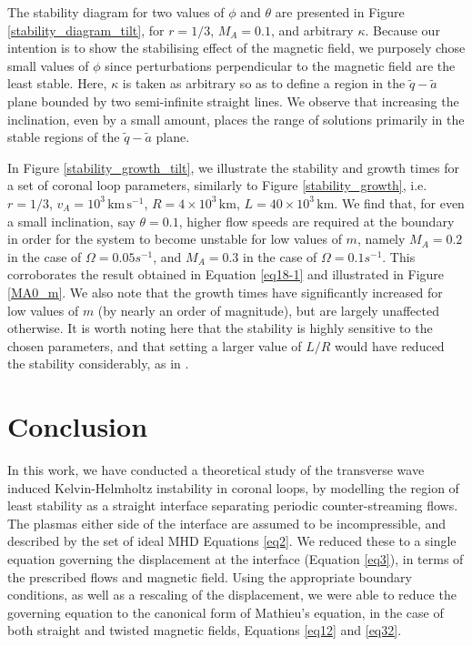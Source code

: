 \documentclass[12pt]{ociamthesis}
\begin{document}
The stability diagram for two values of $\phi$ and $\theta$ are presented in Figure \ref{stability_diagram_tilt}, for $r=1/3$, $M_A=0.1$, and arbitrary $\kappa$.
Because our intention is to show the stabilising effect of the magnetic field, we purposely chose small values of $\phi$ since perturbations perpendicular to the magnetic field are the least stable.
Here, $\kappa$ is taken as arbitrary so as to define a region in the $\tilde q - \tilde a$ plane bounded by two semi-infinite straight lines.
We observe that increasing the inclination, even by a small amount, places the range of solutions primarily in the stable regions of the $\tilde q - \tilde a$ plane.

In Figure \ref{stability_growth_tilt}, we illustrate the stability and growth times for a set of coronal loop parameters, similarly to Figure \ref{stability_growth}, i.e. $r = 1/3$, $v_A = 10^3 \, \mathrm{km}\, \mathrm{s}^{-1}$, $R = 4 \times 10^3 \, \mathrm{km}$, $L = 40 \times 10^3 \, \mathrm{km}$.
We find that, for even a small inclination, say $\theta = 0.1$, higher flow speeds are required at the boundary in order for the system to become unstable for low values of $m$, namely $M_A = 0.2$ in the case of $\Omega = 0.05 s^{-1}$, and $M_A = 0.3$ in the case of $\Omega = 0.1 s^{-1}$.
This corroborates the result obtained in Equation \eqref{eq18-1} and illustrated in Figure \ref{MA0_m}.
We also note that the growth times have significantly increased for low values of $m$ (by nearly an order of magnitude), but are largely unaffected otherwise.
It is worth noting here that the stability is highly sensitive to the chosen parameters, and that setting a larger value of $L/R$ would have reduced the stability considerably, as in \cite{Howson2017a}.

\section{Conclusion}

In this work, we have conducted a theoretical study of the transverse wave induced Kelvin-Helmholtz instability in coronal loops, by modelling the region of least stability as a straight interface separating periodic counter-streaming flows.
The plasmas either side of the interface are assumed to be incompressible, and described by the set of ideal MHD Equations \eqref{eq2}.
We reduced these to a single equation governing the displacement at the interface (Equation \ref{eq3}), in terms of the prescribed flows and magnetic field.
Using the appropriate boundary conditions, as well as a rescaling of the displacement, we were able to reduce the governing equation to the canonical form of Mathieu's equation, in the case of both straight and twisted magnetic fields, Equations \eqref{eq12} and \eqref{eq32}.
\end{document}
